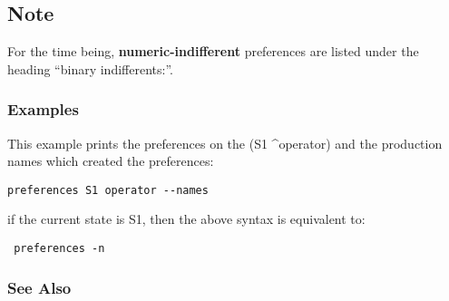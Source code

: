 \subsection*{Note}
 For the time being, \textbf{numeric-indifferent}
 preferences are listed under the heading ``binary indifferents:''. 
\subsubsection*{Examples}
 This example prints the preferences on the (S1 \^{}operator) and the production names which created the preferences: \begin{verbatim}
preferences S1 operator --names
\end{verbatim}
 if the current state is S1, then the above syntax is equivalent to: \begin{verbatim}
 preferences -n
\end{verbatim}
\subsubsection*{See Also}
